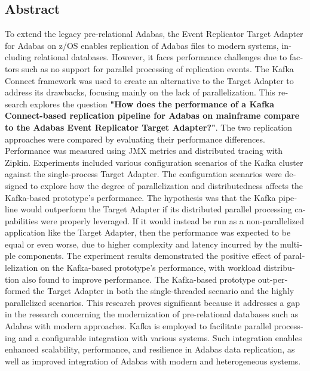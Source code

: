

\begin{otherlanguage}{american}
	\chapter*{Abstract}
	To extend the legacy pre-relational Adabas, the Event Replicator Target Adapter for Adabas on z/OS enables replication of Adabas files to modern systems, including relational databases. However, it faces performance challenges due to factors such as no support for parallel processing of replication events. The Kafka Connect framework was used to create an alternative to the Target Adapter to address its drawbacks, focusing mainly on the lack of parallelization. This research explores the question \textbf{"How does the performance of a Kafka Connect-based replication pipeline for Adabas on mainframe compare to the Adabas Event Replicator Target Adapter?"}. The two replication approaches were compared by evaluating their performance differences. Performance was measured using JMX metrics and distributed tracing with Zipkin. Experiments included various configuration scenarios of the Kafka cluster against the single-process Target Adapter. The configuration scenarios were designed to explore how the degree of parallelization and distributedness affects the Kafka-based prototype's performance.
    The hypothesis was that the Kafka pipeline would outperform the Target Adapter if its distributed parallel processing capabilities were properly leveraged. If it would instead be run as a non-parallelized application like the Target Adapter, then the performance was expected to be equal or even worse, due to higher complexity and latency incurred by the multiple components.
    The experiment results demonstrated the positive effect of parallelization on the Kafka-based prototype's performance, with workload distribution also found to improve performance. The Kafka-based prototype out-performed the Target Adapter in both the single-threaded scenario and the highly parallelized scenarios.
    This research proves significant because it addresses a gap in the research concerning the modernization of pre-relational databases such as Adabas with modern approaches. Kafka is employed to facilitate parallel processing and a configurable integration with various systems. Such integration enables enhanced scalability, performance, and resilience in Adabas data replication, as well as improved integration of Adabas with modern and heterogeneous systems.
\end{otherlanguage}
